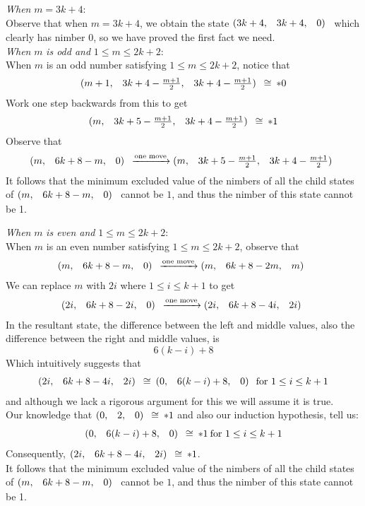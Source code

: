 \documentclass{article}
\makeatletter
\newcommand{\game}[3]{\begin{array}{@{}*6r}(#1, & #2, & #3)\end{array}}
\newcommand{\gcong}{\cong\:}
\makeatother
\begin{document}
\bigskip
\textit{When} $m = 3k + 4$:\\
Observe that when $m = 3k + 4$, we obtain the state
$\game{3k+4}{3k+4}{0}$ which clearly has nimber $0$,
so we have proved the first fact we need. \\

\bigskip
\textit{When} $m$ \textit{is odd and} $1 \leq m \leq 2k + 2$:\\
When $m$ is an odd number satisfying $1 \leq m \leq 2k + 2$,
notice that
\begin{equation*}
  \game{m+1}{3k+4-\frac{m+1}{2}}{3k+4-\frac{m+1}{2}} \gcong *0
\end{equation*}
Work one step backwards from this to get
\begin{equation*}
  \game{m}{3k+5-\frac{m+1}{2}}{3k+4-\frac{m+1}{2}} \gcong *1
\end{equation*}
Observe that
\begin{equation*}
  \game{m}{6k+8-m}{0} \xrightarrow{\text{one move}}
  \game{m}{3k+5-\frac{m+1}{2}}{3k+4-\frac{m+1}{2}}
\end{equation*}
It follows that the minimum excluded value of the nimbers of
all the child states of $\game{m}{6k+8-m}{0}$ cannot be $1$, and
thus the nimber of this state cannot be 1.

\newpage
\textit{When} $m$ \textit{is even and} $1 \leq m \leq 2k + 2$:\\
When $m$ is an even number satisfying $1 \leq m \leq 2k + 2$,
observe that 
\begin{equation*}
  \game{m}{6k+8-m}{0} \xrightarrow{\text{one move}}
  \game{m}{6k+8-2m}{m}
\end{equation*}
We can replace $m$ with $2i$ where $1 \leq i \leq k + 1$ to get
\begin{equation*}
  \game{2i}{6k+8-2i}{0} \xrightarrow{\text{one move}}
  \game{2i}{6k+8-4i}{2i}
\end{equation*}
In the resultant state, the difference between the left and middle
values, also the difference between the right and middle values, is
\begin{equation*}
  6(k - i) + 8
\end{equation*}
Which intuitively suggests that
\begin{equation*}
  \game{2i}{6k+8-4i}{2i} \gcong \game{0}{6(k - i) + 8}{0} \:
  \text{for $1 \leq i \leq k + 1$}
\end{equation*}
and although we lack a rigorous argument for this we will assume it is
true. \\
Our knowledge that $\game{0}{2}{0} \gcong *1$ and also our induction
hypothesis, tell us:
\begin{equation*}
  \game{0}{6(k - i) + 8}{0} \gcong *1 \:
  \text{for $1 \leq i \leq k + 1$}
\end{equation*}
Consequently, $\game{2i}{6k+8-4i}{2i} \gcong *1$. \\
It follows that the minimum excluded value of the nimbers of
all the child states of $\game{m}{6k+8-m}{0}$ cannot be $1$, and
thus the nimber of this state cannot be 1.
\end{document}
